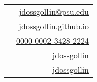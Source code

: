 \begin{minipage}[t][][b]{0.7\linewidth}
	\color{BrickRed}{\Huge James Doss-Gollin}
\end{minipage}%
\begin{minipage}[b][][b]{0.3\linewidth}
	{\color{gray}
		\begin{tabular}{r}
			\faEnvelope~~\href{mailto:jdossgollin@psu.edu}{jdossgollin@psu.edu}                 \\
			\faHome~~\href{https://jdossgollin.github.io}{jdossgollin.github.io}                \\
			{\aiicon{orcid}}~~\href{https://orcid.org/0000-0002-3428-2224}{0000-0002-3428-2224} \\
			\faGithub~~\href{https://github.com/jdossgollin}{jdossgollin}                       \\
			\faTwitter~~\href{https://twitter.com/jdossgollin}{jdossgollin}                     
		\end{tabular}
	}
\end{minipage}